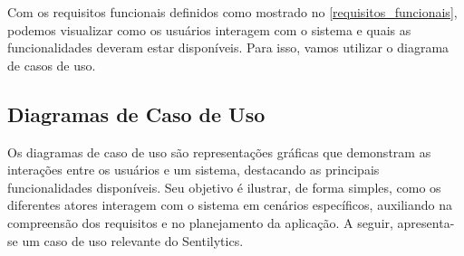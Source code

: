 \documentclass[
	12pt,				%
	oneside,			%
	a4paper,			%
	english,			%
	french,				%
	spanish,			%
	brazil				%
	]{abntex2}
\begin{document}
Com os requisitos funcionais definidos como mostrado no
\autoref{requisitos_funcionais}, podemos visualizar como os usuários
interagem com o sistema e quais as funcionalidades deveram estar
disponíveis. Para isso, vamos utilizar o diagrama de casos de uso.

\hypertarget{diagramas-de-caso-de-uso}{%
\subsection{Diagramas de Caso de Uso}\label{diagramas-de-caso-de-uso}}

Os diagramas de caso de uso são representações gráficas que demonstram
as interações entre os usuários e um sistema, destacando as principais
funcionalidades disponíveis. Seu objetivo é ilustrar, de forma simples,
como os diferentes atores interagem com o sistema em cenários
específicos, auxiliando na compreensão dos requisitos e no planejamento
da aplicação. A seguir, apresenta-se um caso de uso relevante do
Sentilytics.
\end{document}
